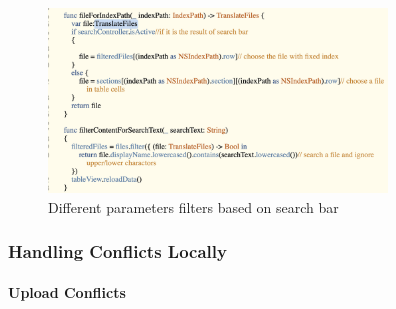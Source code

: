 \documentclass{article}
\begin{document}
\begin{figure}[H]
\begin{center}
\includegraphics[width=9cm]{34.png}
\end{center}
\caption{Different parameters filters based on search bar}\label{ex42}
\end{figure}

\subsubsection{Handling Conflicts Locally}

\paragraph{Upload Conflicts}\mbox{} \\
\end{document}
